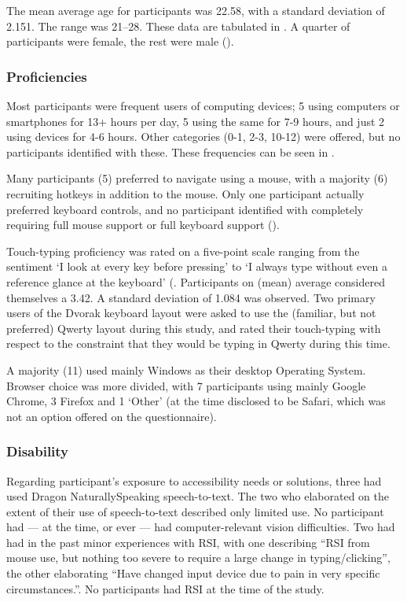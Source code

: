 \documentclass[11pt,openright,a4paper]{report}
\begin{document}
The mean average age for participants was 22.58, with a standard deviation of 2.151. The range was 21--28. These data are tabulated in .
A quarter of participants were female, the rest were male ().

\subsubsection{Proficiencies}
Most participants were frequent users of computing devices; 5 using computers or smartphones for 13+ hours per day, 5 using the same for 7-9 hours, and just 2 using devices for 4-6 hours. Other categories (0-1, 2-3, 10-12) were offered, but no participants identified with these. These frequencies can be seen in .

Many participants (5) preferred to navigate using a mouse, with a majority (6) recruiting hotkeys in addition to the mouse. Only one participant actually preferred keyboard controls, and no participant identified with completely requiring full mouse support or full keyboard support ().

Touch-typing proficiency was rated on a five-point scale ranging from the sentiment `I look at every key before pressing' to `I always type without even a reference glance at the keyboard' (. Participants on (mean) average considered themselves a 3.42. A standard deviation of 1.084 was observed. Two primary users of the Dvorak keyboard layout were asked to use the (familiar, but not preferred) Qwerty layout during this study, and rated their touch-typing with respect to the constraint that they would be typing in Qwerty during this time.

A majority (11) used mainly Windows as their desktop Operating System. Browser choice was more divided, with 7 participants using mainly Google Chrome, 3 Firefox and 1 `Other' (at the time disclosed to be Safari, which was not an option offered on the questionnaire).

\subsubsection{Disability}
Regarding participant's exposure to accessibility needs or solutions, three had used Dragon NaturallySpeaking speech-to-text. The two who elaborated on the extent of their use of speech-to-text described only limited use. No participant had --- at the time, or ever --- had computer-relevant vision difficulties. Two had had in the past minor experiences with RSI, with one describing ``RSI from mouse use, but nothing too severe to require a large change in typing/clicking'', the other elaborating ``Have changed input device due to pain in very specific circumstances.''. No participants had RSI at the time of the study.
\end{document}
